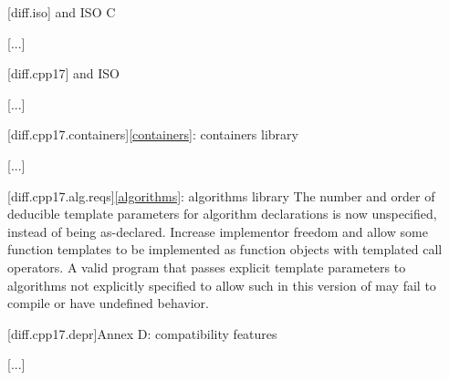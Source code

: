 \setcounter{chapter}{2}

[diff.iso]{\Cpp{} and ISO C}

[...]

\setcounter{section}{4}
[diff.cpp17]{\Cpp{} and ISO \CppXVII{}}

[...]

\setcounter{subsection}{7}
[diff.cpp17.containers]{\ref{containers}: containers library}

[...]

\begin{addedblock}
[diff.cpp17.alg.reqs]{\ref{algorithms}: algorithms library}
\change
The number and order of deducible template parameters for algorithm declarations
is now unspecified, instead of being as-declared.
\rationale Increase implementor freedom and allow some function templates
to be implemented as function objects with templated call operators.
\effect
A valid \CppXVII{} program that passes explicit template parameters to
algorithms not explicitly specified to allow such in this version of \Cpp{}
may fail to compile or have undefined behavior.
\end{addedblock}

[diff.cpp17.depr]{Annex D: compatibility features}

[...]
